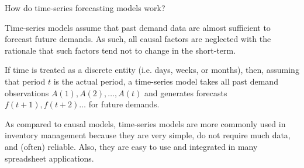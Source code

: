 \begin{exercise}
How do time-series forecasting models work?



  \begin{solution}
Time-series models assume that past demand data are almost sufficient to forecast future demands. As such, all causal factors are neglected with the rationale that such factors tend not to change in the short-term. 

If time is treated as a discrete entity (i.e. days, weeks, or months), then, assuming that period $t$ is the actual period, a time-series model takes all past demand observations $A(1),A(2),\ldots,A(t)$ and generates forecasts $f(t+1),f(t+2)\ldots$ for future demands. 

As compared to causal models, time-series models are more commonly used in inventory management because they are very simple, do not require much data, and (often) reliable. Also, they are easy to use and integrated in many spreadsheet applications.
  \end{solution}
\end{exercise}


